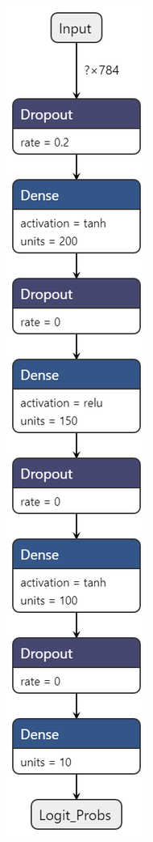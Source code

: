 \documentclass[11pt]{article}
\begin{document}
\pagebreak
\begin{figure}[H]
    \centering
    \begin{subfigure}[c]{0.24\textwidth}
        \centering
        \includegraphics[height = 0.95\textheight]{normal5.png}

\end{subfigure}
\end{figure}
\end{document}
